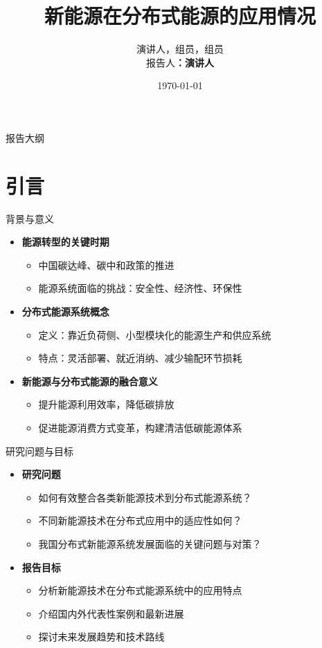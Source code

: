 \documentclass[aspectratio=169]{beamer}
\title{新能源在分布式能源的应用情况}
\author{演讲人，组员，组员 \\报告人\textbf{：演讲人}}
\institute{东莞理工学院}
\date{\today}
\begin{document}
\begin{frame}
  \titlepage
\end{frame}

\begin{frame}{报告大纲}
  \tableofcontents
\end{frame}

\section{引言}

\begin{frame}{背景与意义}
  \begin{itemize}
    \item \textbf{能源转型的关键时期}
      \begin{itemize}
        \item 中国碳达峰、碳中和政策的推进\cite{Zhou2022}
        \item 能源系统面临的挑战：安全性、经济性、环保性
      \end{itemize}
    \item \textbf{分布式能源系统概念}
      \begin{itemize}
        \item 定义：靠近负荷侧、小型模块化的能源生产和供应系统
        \item 特点：灵活部署、就近消纳、减少输配环节损耗
      \end{itemize}
    \item \textbf{新能源与分布式能源的融合意义}
      \begin{itemize}
        \item 提升能源利用效率，降低碳排放
        \item 促进能源消费方式变革，构建清洁低碳能源体系\cite{Li2021}
      \end{itemize}
  \end{itemize}
\end{frame}

\begin{frame}{研究问题与目标}
  \begin{itemize}
    \item \textbf{研究问题}
      \begin{itemize}
        \item 如何有效整合各类新能源技术到分布式能源系统？
        \item 不同新能源技术在分布式应用中的适应性如何？
        \item 我国分布式新能源系统发展面临的关键问题与对策？
      \end{itemize}
    \item \textbf{报告目标}
      \begin{itemize}
        \item 分析新能源技术在分布式能源系统中的应用特点
        \item 介绍国内外代表性案例和最新进展
        \item 探讨未来发展趋势和技术路线\cite{Wang2023}
      \end{itemize}
  \end{itemize}
\end{frame}
\end{document}

